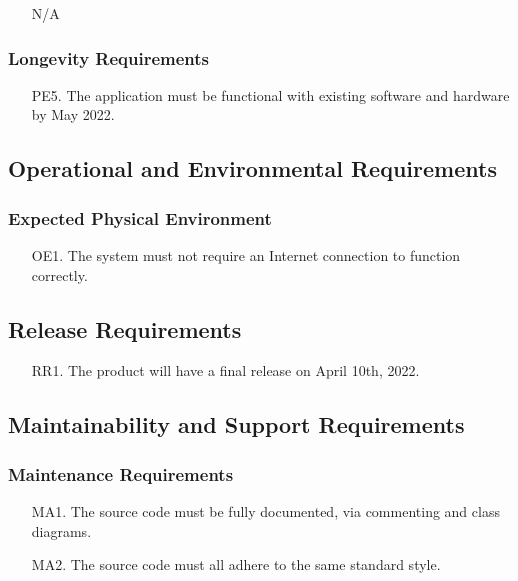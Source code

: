 \documentclass[12pt, titlepage]{article}
\begin{document}
\begin{itemize}
  \item[] N/A
\end{itemize}

\subsubsection{ Longevity Requirements}

\begin{itemize}
  \item[PE5.] The application must be functional with existing software and hardware by May 2022. 
\end{itemize}

\subsection{Operational and Environmental Requirements}

\subsubsection{ Expected Physical Environment}

\begin{itemize}
  \item[OE1.] The system must not require an Internet connection to function correctly.
\end{itemize}

\subsection{Release Requirements}

\begin{itemize}
  \item[RR1.] The product will have a final release on April 10th, 2022. 
\end{itemize}

\subsection{Maintainability and Support Requirements}

\subsubsection{Maintenance Requirements}

\begin{itemize}
  \item[MA1.] The source code must be fully documented, via commenting and class diagrams. 
  \item[MA2.] The source code must all adhere to the same standard style. 
\end{itemize}
\end{document}
